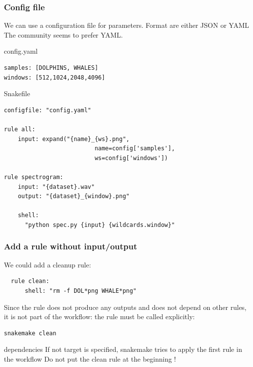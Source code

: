 \documentclass{beamer}
\begin{document}
\begin{frame}[fragile]
    \frametitle{Config file}
     We can use a configuration file for parameters. Format are either JSON or YAML
    The community seems to prefer YAML.
    
    \begin{block}{config.yaml}
        \begin{lstlisting}
samples: [DOLPHINS, WHALES]
windows: [512,1024,2048,4096]
        \end{lstlisting}
    \end{block}
    \begin{block}{Snakefile}
    \begin{lstlisting}
configfile: "config.yaml"

rule all:
    input: expand("{name}_{ws}.png", 
                          name=config['samples'], 
                          ws=config['windows'])

rule spectrogram:
    input: "{dataset}.wav"
    output: "{dataset}_{window}.png"
    
    shell: 
      "python spec.py {input} {wildcards.window}"
    \end{lstlisting}
    \end{block}
\end{frame}


\begin{frame}[fragile]
 \frametitle{Add a rule without input/output}
 
 We could add a cleanup rule:
 
 \begin{block}{}
 \begin{lstlisting}
  rule clean:
      shell: "rm -f DOL*png WHALE*png"
    \end{lstlisting}
 \end{block}

 Since the rule does not produce any outputs and does not depend on other rules, 
 it is not part of the workflow: the rule must be called explicitly:
 
 
 \begin{block}{}
 \begin{lstlisting}[language=bash]
 snakemake clean
 \end{lstlisting}
 \end{block}
 
 \begin{alertblock}{dependencies}
  If not target is specified, snakemake tries to apply the first rule in the workflow
  Do not put the clean rule at the beginning !
 \end{alertblock} 
\end{frame}
\end{document}

